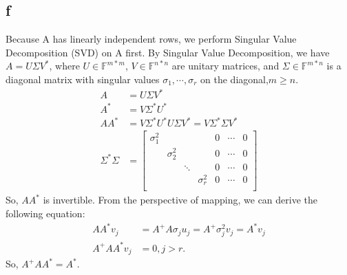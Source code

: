 \documentclass[a4paper]{article}
\begin{document}
\subsection*{f}
Because A has linearly independent rows, we perform Singular Value Decomposition (SVD) on A first.
By Singular Value Decomposition, we have $A = U\Sigma V^*$, where $U \in \mathbb{F}^{m * m}$, $V \in \mathbb{F}^{n * n}$ are unitary matrices, and $\Sigma \in \mathbb{F}^{m * n}$ is a diagonal matrix with singular values $\sigma_1, \cdots, \sigma_r$ on the diagonal,$m\geqslant n$. 
\begin{align*}
  A &= U\Sigma V^* \\
  A^*&=V\Sigma^*U^* \\
  AA^*&=V\Sigma^*U^*U\Sigma V^*=V\Sigma^*\Sigma V^*\\
  \Sigma^*\Sigma &= \begin{bmatrix}
                    \sigma_1^2 & & & & 0&\cdots&0\\
                    & \sigma_2^2 & & & 0&\cdots&0\\
                    & & \ddots & & 0&\cdots&0\\
                    & & & \sigma_r^2& 0&\cdots&0\\
                  \end{bmatrix}
\end{align*}
So, $AA^*$ is invertible.
From the perspective of mapping, we can derive the following equation:
\begin{align*}
  AA^*v_j &= A^+A\sigma_ju_j = A^+\sigma_j^2v_j = A^* v_j\\
  A^+AA^*v_j &= 0 , j>r.
\end{align*}
So, $A^+AA^* = A^*$.

\section*{  }
\printbibliography
\end{document}
